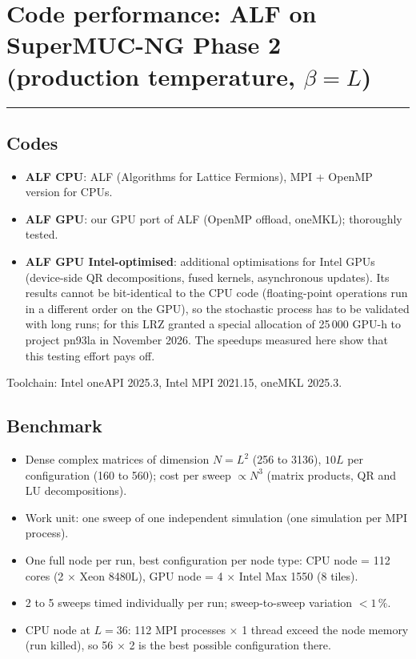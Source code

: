\documentclass[11pt]{article}
\newcommand{\gcssection}[1]{\section*{#1}\vspace{-1.5ex}\noindent\rule{\textwidth}{0.4pt}\par}
\begin{document}
\gcssection{Code performance: ALF on SuperMUC-NG Phase 2 (production temperature, $\beta=L$)}

\subsection*{Codes}
\begin{itemize}
\item \textbf{ALF CPU}: ALF (Algorithms for Lattice Fermions), MPI + OpenMP version for CPUs.
\item \textbf{ALF GPU}: our GPU port of ALF (OpenMP offload, oneMKL); thoroughly tested.
\item \textbf{ALF GPU Intel-optimised}: additional optimisations for Intel GPUs (device-side QR decompositions, fused
  kernels, asynchronous updates). Its results cannot be bit-identical to the CPU code (floating-point operations run in a different order on the GPU), so the stochastic process has to be
  validated with long runs; for this LRZ granted a special allocation of 25\,000 GPU-h to project pn93la in November 2026.
  The speedups measured here show that this testing effort pays off.
\end{itemize}
Toolchain: Intel oneAPI 2025.3, Intel MPI 2021.15, oneMKL 2025.3.

\subsection*{Benchmark}
\begin{itemize}
\item Dense complex matrices of dimension $N=L^2$ (256 to 3136), $10L$ per configuration (160 to 560); cost per sweep $\propto N^3$
  (matrix products, QR and LU decompositions).
\item Work unit: one sweep of one independent simulation (one simulation per MPI process).
\item One full node per run, best configuration per node type: CPU node = 112 cores (2 $\times$ Xeon 8480L),
  GPU node = 4 $\times$ Intel Max 1550 (8 tiles).
\item 2 to 5 sweeps timed individually per run; sweep-to-sweep variation $<1\,\%$.
\item CPU node at $L=36$: 112 MPI processes $\times$ 1 thread exceed the node memory (run killed), so 56 $\times$ 2 is the best possible configuration there.
\end{itemize}
\end{document}
